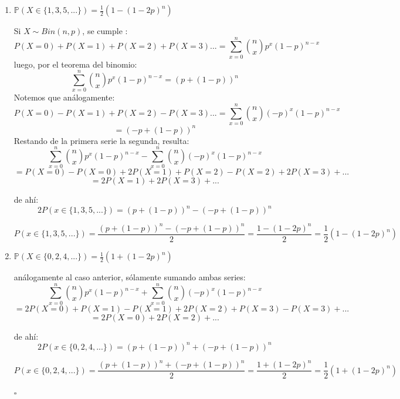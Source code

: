 \documentclass[11pt,a4paper]{report}
\begin{document}
\begin{enumerate}
{\begin{enumerate}
{					se sigue que:
						$$ \frac{p}{1 - p}{n \choose x + 1}p^x (1-p)^{n - x}
						   = \frac{p}{1 - p} \cdot \frac{n - x}{x - 1}
						     {n \choose x} p^x (1-p)^{n - x}$$
					notemos que de lo anterior, podemos extraer la función de
					densidad para $P(X = x)$, entonces:
						$$ \frac{p}{1 - p} \cdot \frac{n - x}{x - 1}
						  {n \choose x} p^x (1-p)^{n - x}
						  = \frac{p}{1-p} \cdot \frac{n - x}{x - 1} f_X^{(x)}$$
						$$ = \frac{p}{1-p} \cdot \frac{n - x}{x - 1} P(X = x)$$
				}

				\item {
					$\mathbb{P}(X \in \{ 1,3,5,...\}) = \frac{1}{2}
					 (1 - (1 - 2p)^n)$

					Si $X \sim Bin(n, p)$, se cumple :
						$$ P(X = 0) + P(X = 1) + P(X = 2) + P(X = 3) ...
						   = \sum_{x = 0}^{n} {n \choose x}p^x(1 - p)^{n - x}$$
					luego, por el teorema del binomio:
						$$ \sum_{x = 0}^{n} {n \choose x}p^x(1 - p)^{n - x}
						   = (p + (1 - p))^n$$
					Notemos que análogamente:
						$$ P(X = 0) - P(X = 1) + P(X = 2) - P(X = 3) ...
						   = \sum_{x = 0}^{n}{n \choose x}(-p)^x(1-p)^{n-x}$$
						$$ = (- p + (1 - p))^n $$
					Restando de la primera serie la segunda, resulta:
						$$ \sum_{x = 0}^{n} {n \choose x}p^x(1 - p)^{n - x}
						 - \sum_{x = 0}^{n}{n \choose x}(-p)^x(1-p)^{n - x} $$
						$$ = P(X = 0) - P(X = 0) + 2P(X = 1) +
							 P(X = 2) - P(X = 2) + 2P(X = 3) + ...$$
						$$ = 2 P(X = 1) + 2 P(X = 3) + ...$$

					de ahí:
						$$ 2 P(x \in \{1,3,5,...\})
						   = (p + (1 - p))^n - (- p + (1 - p))^n $$

						$$ P(x \in \{1,3,5,...\})
						   = \frac{(p + (1 - p))^n - (- p + (1 - p))^n}{2}
						   = \frac{1 - (1 - 2p)^n}{2}
						   = \frac{1}{2}(1 - (1 - 2p)^n)$$
				}

				\item {
					$\mathbb{P}(X \in \{ 0,2,4,...\}) = \frac{1}{2}
					 (1 + (1 - 2p)^n)$

					análogamente al caso anterior, sólamente sumando ambas
					series:
						$$ \sum_{x = 0}^{n} {n \choose x}p^x(1 - p)^{n - x}
						 + \sum_{x = 0}^{n}{n \choose x}(-p)^x(1-p)^{n - x} $$
						$$ = 2 P(X = 0) + P(X = 1) - P(X = 1) +
							 2 P(X = 2) + P(X = 3) - P(X = 3) + ...$$
						$$ = 2 P(X = 0) + 2 P(X = 2) + ...$$

						de ahí:
						$$ 2 P(x \in \{0,2,4,...\})
						   = (p + (1 - p))^n + (- p + (1 - p))^n $$

						$$ P(x \in \{0,2,4,...\})
						   = \frac{(p + (1 - p))^n + (- p + (1 - p))^n}{2}
						   = \frac{1 + (1 - 2p)^n}{2}
						   = \frac{1}{2}(1 + (1 - 2p)^n)$$
														     \begin{flushright}
													 		  	$\square$
													 	  	  \end{flushright}
				}
			\end{enumerate}
		}


\end{enumerate}
\end{document}
